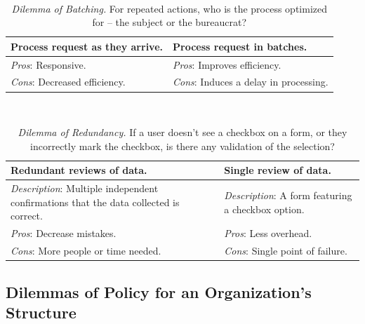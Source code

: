 \ \\

\begin{center}
\begin{table}[H] %
\begin{tabular}{ | m{\dilemmatablewidth}| m{\dilemmatablewidth} | } 
  \hline
  \textbf{Process request as they arrive.} &
  \textbf{Process request in batches.} \\
  \hline
  \textit{Pros}: Responsive. & 
  \textit{Pros}: Improves efficiency. \\
  \hline
  \textit{Cons}: Decreased efficiency. & 
  \textit{Cons}: Induces a delay in processing. \\
  \hline
\end{tabular}
\caption{\textit{Dilemma of Batching.}
For repeated actions, who is the process optimized for -- the subject or the bureaucrat?
}
\label{table:dilemma-of-batching}
\end{table}
\end{center}

\ \\

\begin{center}
\begin{table}[H] %
\begin{tabular}{ | m{\dilemmatablewidth}| m{\dilemmatablewidth} | } 
  \hline
  \textbf{Redundant reviews of data.} &
  \textbf{Single review of data.} \\
  \hline
  \textit{Description}: Multiple independent confirmations that the data collected is correct. & 
  \textit{Description}: A form featuring a checkbox option.  \\
  \hline
  \textit{Pros}: Decrease mistakes. & 
  \textit{Pros}: Less overhead. \\
  \hline
  \textit{Cons}: More people or time needed. & 
  \textit{Cons}: Single point of failure. \\
  \hline
\end{tabular}
\caption{\textit{Dilemma of Redundancy.}
If a user doesn't see a checkbox on a form, or they incorrectly mark the checkbox, is there any validation of the selection?
}
\label{table:dilemma-of-redundancy}
\end{table}
\end{center}


\subsection*{Dilemmas of Policy for an Organization's Structure\label{sec:org_dilemma}}

